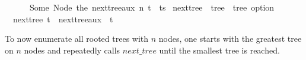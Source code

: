 \begin{isabellebox}
    \ \ \ \ \ \ Some\ {\isacharparenleft}{\kern0pt}Node\ {\isacharparenleft}{\kern0pt}the\ {\isacharparenleft}{\kern0pt}next{\isacharunderscore}{\kern0pt}tree{\isacharunderscore}{\kern0pt}aux\ n\ t{\isacharparenright}{\kern0pt}\ {\isacharhash}{\kern0pt}\ ts{\isacharparenright}{\kern0pt}{\isacharparenright}{\kern0pt}{\isachardoublequoteclose}\isanewline
    \isanewline
    \isamarkupfalse%
    \ next{\isacharunderscore}{\kern0pt}tree\ {\isacharcolon}{\kern0pt}{\isacharcolon}{\kern0pt}\ {\isachardoublequoteopen}tree\ {\isasymRightarrow}\ tree\ option{\isachardoublequoteclose}\ \isanewline
    \ \ {\isachardoublequoteopen}next{\isacharunderscore}{\kern0pt}tree\ t\ {\isacharequal}{\kern0pt}\ next{\isacharunderscore}{\kern0pt}tree{\isacharunderscore}{\kern0pt}aux\ {}\ t{\isachardoublequoteclose}
\end{isabellebox}

To now enumerate all rooted trees with $n$ nodes,
one starts with the greatest tree on $n$ nodes and repeatedly calls $next\_tree$ until the smallest tree is reached.

